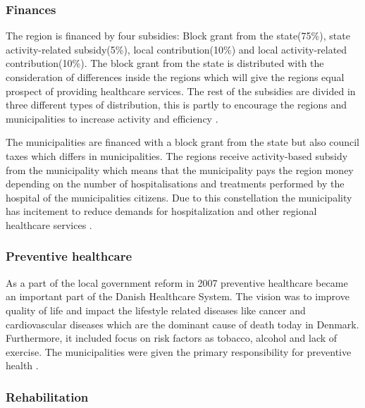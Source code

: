





\subsubsection{Finances}

The region is financed by four subsidies: Block grant from the state(75\%), state activity-related subsidy(5\%), local contribution(10\%) and local activity-related contribution(10\%). The block grant from the state is distributed with the consideration of differences inside the regions which will give the regions equal prospect of providing healthcare services. The rest of the subsidies are divided in three different types of distribution, this is partly to encourage the regions and municipalities to increase activity and efficiency \cite{sundhedsministeriet}.

The municipalities are financed with a block grant from the state but also council taxes which differs in municipalities. The regions receive activity-based subsidy from the municipality which means that the municipality pays the region money depending on the number of hospitalisations and treatments performed by the hospital of the municipalities citizens. Due to this constellation the municipality has incitement to reduce demands for hospitalization and other regional healthcare services \cite{Healthcareindk2}.


\subsubsection{Preventive healthcare}

As a part of the local government reform in 2007 preventive healthcare became an important part of the Danish Healthcare System. The vision was to improve quality of life and impact the lifestyle related diseases like cancer and cardiovascular diseases which are the dominant cause of death today in Denmark. Furthermore, it included focus on risk factors as tobacco, alcohol and lack of exercise. The municipalities were given the primary responsibility for preventive health \cite{sundhedsministeriet}.

\subsubsection{Rehabilitation}

